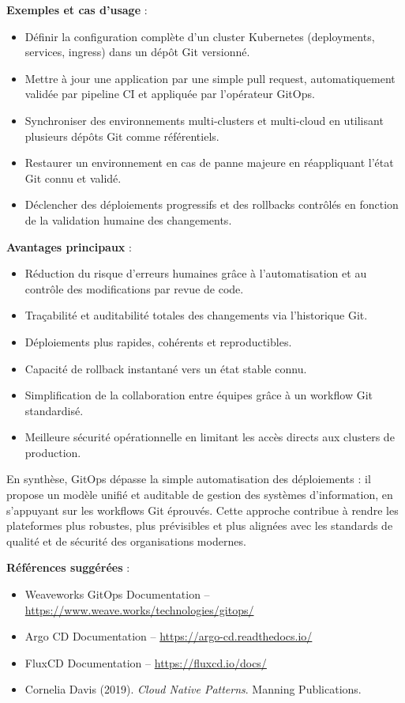 \textbf{Exemples et cas d’usage} :
\begin{itemize}
	\item Définir la configuration complète d’un cluster Kubernetes (deployments, services, ingress) dans un dépôt Git versionné.
	\item Mettre à jour une application par une simple pull request, automatiquement validée par pipeline CI et appliquée par l’opérateur GitOps.
	\item Synchroniser des environnements multi-clusters et multi-cloud en utilisant plusieurs dépôts Git comme référentiels.
	\item Restaurer un environnement en cas de panne majeure en réappliquant l’état Git connu et validé.
	\item Déclencher des déploiements progressifs et des rollbacks contrôlés en fonction de la validation humaine des changements.
\end{itemize}

\textbf{Avantages principaux} :
\begin{itemize}
	\item Réduction du risque d’erreurs humaines grâce à l’automatisation et au contrôle des modifications par revue de code.
	\item Traçabilité et auditabilité totales des changements via l’historique Git.
	\item Déploiements plus rapides, cohérents et reproductibles.
	\item Capacité de rollback instantané vers un état stable connu.
	\item Simplification de la collaboration entre équipes grâce à un workflow Git standardisé.
	\item Meilleure sécurité opérationnelle en limitant les accès directs aux clusters de production.
\end{itemize}

En synthèse, GitOps dépasse la simple automatisation des déploiements : il propose un modèle unifié et auditable de gestion des systèmes d’information, en s’appuyant sur les workflows Git éprouvés. Cette approche contribue à rendre les plateformes plus robustes, plus prévisibles et plus alignées avec les standards de qualité et de sécurité des organisations modernes.

\textbf{Références suggérées} :
\begin{itemize}
	\item Weaveworks GitOps Documentation – \url{https://www.weave.works/technologies/gitops/}
	\item Argo CD Documentation – \url{https://argo-cd.readthedocs.io/}
	\item FluxCD Documentation – \url{https://fluxcd.io/docs/}
	\item Cornelia Davis (2019). \textit{Cloud Native Patterns}. Manning Publications.
\end{itemize}

